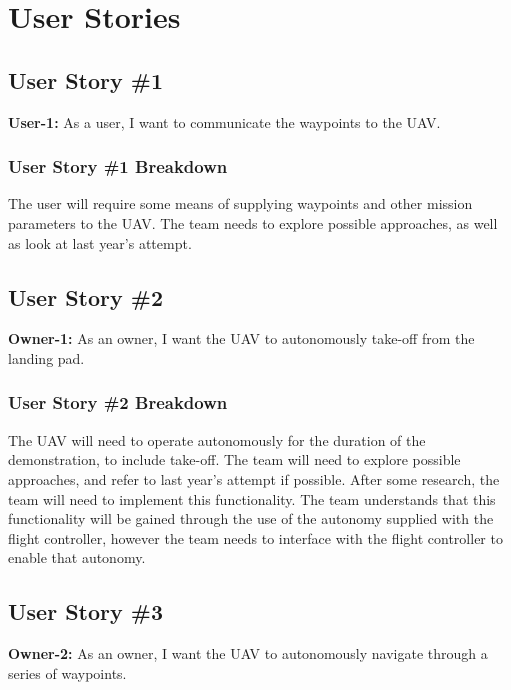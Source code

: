 \section{User Stories}

\subsection{User Story \#1}
\textbf{User-1:} As a user, I want to communicate the waypoints to the UAV.

\subsubsection{User Story \#1 Breakdown}
The user will require some means of supplying waypoints and other mission parameters to the UAV. The team needs to explore possible approaches, as well as look at last year's attempt. \\

\subsection{User Story \#2} 
\textbf{Owner-1:} As an owner, I want the UAV to autonomously take-off from the landing pad.

\subsubsection{User Story \#2 Breakdown}
The UAV will need to operate autonomously for the duration of the demonstration, to include take-off. The team will need to explore possible approaches, and refer to last year's attempt if possible. After some research, the team will need to implement this functionality. The team understands that this functionality will be gained through the use of the autonomy supplied with the flight controller, however the team needs to interface with the flight controller to enable that autonomy. \\

\subsection{User Story \#3} 
\textbf{Owner-2:} As an owner, I want the UAV to autonomously navigate through a series of waypoints.

